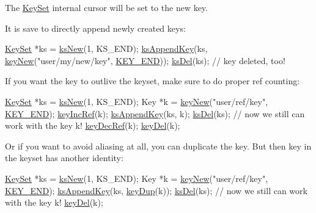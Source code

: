 The \hyperlink{classkdb_1_1KeySet}{Key\+Set} internal cursor will be set to the new key.

It is save to directly append newly created keys\+: 
\begin{DoxyCodeInclude}
\hyperlink{classkdb_1_1KeySet_a4eac9850fa4f06c07a5306befc3e4377}{KeySet} *ks = \hyperlink{group__keyset_ga671e1aaee3ae9dc13b4834a4ddbd2c3c}{ksNew}(1, KS\_END);
\hyperlink{group__keyset_gaa5a1d467a4d71041edce68ea7748ce45}{ksAppendKey}(ks,
        \hyperlink{group__key_gad23c65b44bf48d773759e1f9a4d43b89}{keyNew}(\textcolor{stringliteral}{"user/my/new/key"}, \hyperlink{group__key_gga91fb3178848bd682000958089abbaf40aa8adb6fcb92dec58fb19410eacfdd403}{KEY\_END}));
\hyperlink{group__keyset_ga27e5c16473b02a422238c8d970db7ac8}{ksDel}(ks);
\textcolor{comment}{// key deleted, too!}
\end{DoxyCodeInclude}
 If you want the key to outlive the keyset, make sure to do proper ref counting\+: 
\begin{DoxyCodeInclude}
\hyperlink{classkdb_1_1KeySet_a4eac9850fa4f06c07a5306befc3e4377}{KeySet} *ks = \hyperlink{group__keyset_ga671e1aaee3ae9dc13b4834a4ddbd2c3c}{ksNew}(1, KS\_END);
Key *k = \hyperlink{group__key_gad23c65b44bf48d773759e1f9a4d43b89}{keyNew}(\textcolor{stringliteral}{"user/ref/key"}, \hyperlink{group__key_gga91fb3178848bd682000958089abbaf40aa8adb6fcb92dec58fb19410eacfdd403}{KEY\_END});
\hyperlink{group__key_ga6970a6f254d67af7e39f8e469bb162f1}{keyIncRef}(k);
\hyperlink{group__keyset_gaa5a1d467a4d71041edce68ea7748ce45}{ksAppendKey}(ks, k);
\hyperlink{group__keyset_ga27e5c16473b02a422238c8d970db7ac8}{ksDel}(ks);
\textcolor{comment}{// now we still can work with the key k!}
\hyperlink{group__key_ga2c6433ca22109e4e141946057eccb283}{keyDecRef}(k);
\hyperlink{group__key_ga3df95bbc2494e3e6703ece5639be5bb1}{keyDel}(k);
\end{DoxyCodeInclude}
 Or if you want to avoid aliasing at all, you can duplicate the key. But then key in the keyset has another identity\+: 
\begin{DoxyCodeInclude}
\hyperlink{classkdb_1_1KeySet_a4eac9850fa4f06c07a5306befc3e4377}{KeySet} *ks = \hyperlink{group__keyset_ga671e1aaee3ae9dc13b4834a4ddbd2c3c}{ksNew}(1, KS\_END);
Key *k = \hyperlink{group__key_gad23c65b44bf48d773759e1f9a4d43b89}{keyNew}(\textcolor{stringliteral}{"user/ref/key"}, \hyperlink{group__key_gga91fb3178848bd682000958089abbaf40aa8adb6fcb92dec58fb19410eacfdd403}{KEY\_END});
\hyperlink{group__keyset_gaa5a1d467a4d71041edce68ea7748ce45}{ksAppendKey}(ks, \hyperlink{group__key_gae6ec6a60cc4b8c1463fa08623d056ce3}{keyDup}(k));
\hyperlink{group__keyset_ga27e5c16473b02a422238c8d970db7ac8}{ksDel}(ks);
\textcolor{comment}{// now we still can work with the key k!}
\hyperlink{group__key_ga3df95bbc2494e3e6703ece5639be5bb1}{keyDel}(k);
\end{DoxyCodeInclude}


